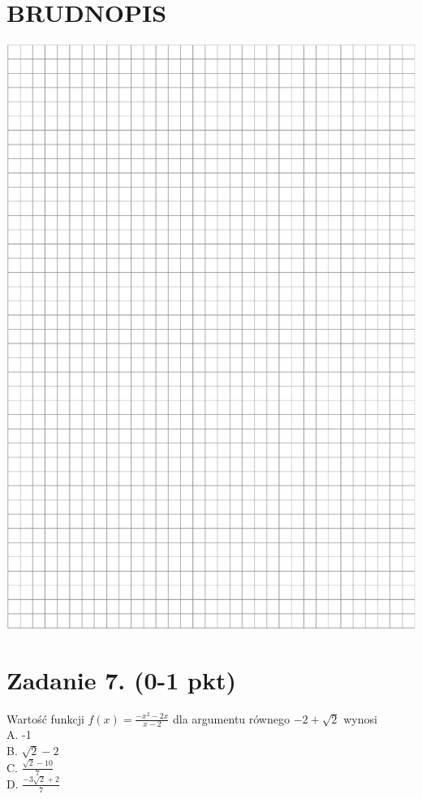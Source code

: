 \documentclass[10pt]{article}
\begin{document}
\section*{BRUDNOPIS}
\begin{center}
\includegraphics[max width=\textwidth]{2024_11_21_832f1bc2b626663f1df2g-03}
\end{center}

\section*{Zadanie 7. (0-1 pkt)}
Wartość funkcji \(f(x)=\frac{-x^{2}-2 x}{x-2}\) dla argumentu równego \(-2+\sqrt{2}\) wynosi\\
A. -1\\
B. \(\sqrt{2}-2\)\\
C. \(\frac{\sqrt{2}-10}{7}\)\\
D. \(\frac{-3 \sqrt{2}+2}{7}\)
\end{document}
